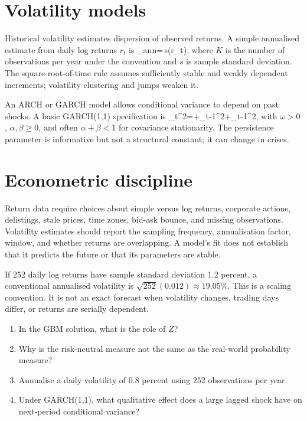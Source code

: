 \section{Volatility models}
Historical volatility estimates dispersion of observed returns. A simple annualised estimate from daily log returns $r_t$ is
  \hat\sigma_{ann}=\,s(r_t),
\closeformula
where $K$ is the number of observations per year under the convention and $s$ is sample standard deviation. The square-root-of-time rule assumes sufficiently stable and weakly dependent increments; volatility clustering and jumps weaken it.

An ARCH or GARCH model allows conditional variance to depend on past shocks. A basic GARCH(1,1) specification is
  \sigma_t^2=\omega+\alpha\varepsilon_{t-1}^2+\beta\sigma_{t-1}^2,
\closeformula
with $\omega>0$, $\alpha,\beta\geq0$, and often $\alpha+\beta<1$ for covariance stationarity. The persistence parameter is informative but not a structural constant; it can change in crises.

\section{Econometric discipline}
Return data require choices about simple versus log returns, corporate actions, delistings, stale prices, time zones, bid-ask bounce, and missing observations. Volatility estimates should report the sampling frequency, annualisation factor, window, and whether returns are overlapping. A model's fit does not establish that it predicts the future or that its parameters are stable.

\begin{worked}
If 252 daily log returns have sample standard deviation 1.2 percent, a conventional annualised volatility is $\sqrt{252}(0.012)\approx19.05\%$. This is a scaling convention. It is not an exact forecast when volatility changes, trading days differ, or returns are serially dependent.
\end{worked}

\begin{exerciseblock}
\begin{enumerate}
  \item In the GBM solution, what is the role of $Z$?
  \item Why is the risk-neutral measure not the same as the real-world probability measure?
  \item Annualise a daily volatility of 0.8 percent using 252 observations per year.
  \item Under GARCH(1,1), what qualitative effect does a large lagged shock have on next-period conditional variance?
\end{enumerate}
\end{exerciseblock}

